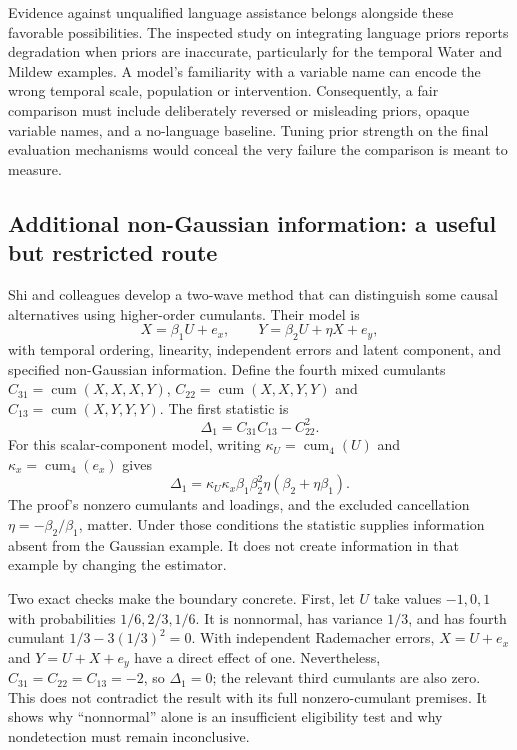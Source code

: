 Evidence against unqualified language assistance belongs alongside these
favorable possibilities. The inspected study on integrating language priors
reports degradation when priors are inaccurate, particularly for the
temporal Water and Mildew examples. A model's familiarity with a variable
name can encode the wrong temporal scale, population or intervention.
Consequently, a fair comparison must include deliberately reversed or
misleading priors, opaque variable names, and a no-language baseline. Tuning
prior strength on the final evaluation mechanisms would conceal the very
failure the comparison is meant to measure.
\citep{v12_la_2306_16902,exec15_latent_design}

\subsection{Additional non-Gaussian information: a useful but restricted route}

Shi and colleagues develop a two-wave method that can distinguish some
causal alternatives using higher-order cumulants. Their model is
\[
 X=\beta_1U+e_x,\qquad Y=\beta_2U+\eta X+e_y,
\]
with temporal ordering, linearity, independent errors and latent component,
and specified non-Gaussian information. Define the fourth mixed cumulants
$C_{31}=\operatorname{cum}(X,X,X,Y)$,
$C_{22}=\operatorname{cum}(X,X,Y,Y)$ and
$C_{13}=\operatorname{cum}(X,Y,Y,Y)$. The first statistic is
\[
 \Delta_1=C_{31}C_{13}-C_{22}^2.
\]
For this scalar-component model, writing
$\kappa_U=\operatorname{cum}_4(U)$ and
$\kappa_x=\operatorname{cum}_4(e_x)$ gives
\[
 \Delta_1=\kappa_U\kappa_x\beta_1\beta_2^2
                 \eta(\beta_2+\eta\beta_1).
\]
The proof's nonzero cumulants and loadings, and the excluded cancellation
$\eta=-\beta_2/\beta_1$, matter. Under those conditions the statistic supplies
information absent from the Gaussian example. It does not create information
in that example by changing the estimator.
\citep{exec15_latent_shi,exec15_latent_exact}

Two exact checks make the boundary concrete. First, let $U$ take values
$-1,0,1$ with probabilities $1/6,2/3,1/6$. It is nonnormal, has variance
$1/3$, and has fourth cumulant $1/3-3(1/3)^2=0$. With independent
Rademacher errors, $X=U+e_x$ and $Y=U+X+e_y$ have a direct effect of one.
Nevertheless, $C_{31}=C_{22}=C_{13}=-2$, so $\Delta_1=0$; the relevant
third cumulants are also zero. This does not contradict the result with its
full nonzero-cumulant premises. It shows why ``nonnormal'' alone is an
insufficient eligibility test and why nondetection must remain inconclusive.
\citep{exec15_latent_exact}


